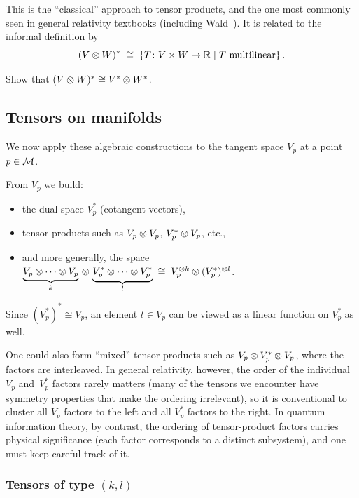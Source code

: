 \noindent
This is the ``classical'' approach to tensor products, and the one
most commonly seen in general relativity textbooks (including
Wald~\cite{Wald84}).  It is related to the informal definition by
\begin{equation}\label{eq:tp-dual-relation}
  (V\otimes W)^* \;\cong\;
  \{T\colon V\times W \to \mathbb{R} \mid T \text{ multilinear}\}\,.
\end{equation}

\begin{exercise}\label{ex:tp-dual-iso}
  Show that $(V\otimes W)^* \cong V^*\otimes W^*$.
\end{exercise}

\subsection{Tensors on manifolds}\label{sec:tensors-manifolds}

We now apply these algebraic constructions to the tangent space
$V_p$ at a point $p\in\mathcal{M}$.

From $V_p$ we build:
\begin{itemize}
  \item the dual space $V_p^*$ (cotangent vectors),
  \item tensor products such as $V_p\otimes V_p$,
    $V_p^*\otimes V_p$, etc.,
  \item and more generally, the space
    $\underbrace{V_p\otimes\cdots\otimes V_p}_{k}\,\otimes\,
     \underbrace{V_p^*\otimes\cdots\otimes V_p^*}_{l}
     \;\cong\; V_p^{\otimes k}\otimes (V_p^*)^{\otimes l}$.
\end{itemize}

\noindent
Since $(V_p^*)^* \cong V_p$, an element $t\in V_p$ can be viewed
as a linear function on $V_p^*$ as well.

One could also form ``mixed'' tensor products such as
$V_p\otimes V_p^*\otimes V_p$, where the factors are interleaved.  In
general relativity, however, the order of the individual
$V_p$ and~$V_p^*$ factors rarely matters (many of the tensors we
encounter have symmetry properties that make the ordering
irrelevant), so it is conventional to cluster all $V_p$ factors to
the left and all $V_p^*$ factors to the right.  In quantum
information theory, by contrast, the ordering of tensor-product
factors carries physical significance (each factor corresponds to a
distinct subsystem), and one must keep careful track of it.

\subsubsection{Tensors of type $(k,l)$}

